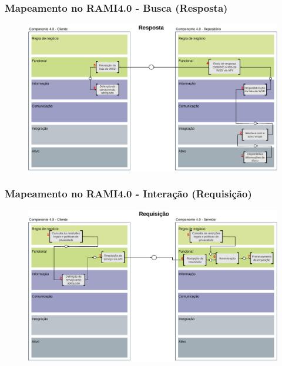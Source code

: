 \documentclass[10pt]{beamer}
\begin{document}
\begin{frame}
	\frametitle{Mapeamento no RAMI4.0 - Busca (Resposta)}
	
	\begin{figure}[htb]
		\centering
		\label{fig:rami-busca-resposta}
		\includegraphics[width=1\textwidth]{rami-busca-resposta}

	\end{figure}

\end{frame}
\begin{frame}
	\frametitle{Mapeamento no RAMI4.0 - Interação (Requisição)}
	
	\begin{figure}[htb]
		\centering
		\label{fig:rami-interacao-requisicao}
		\includegraphics[width=1\textwidth]{rami-interacao-requisicao}
	
	\end{figure}
	
\end{frame}
\end{document}
